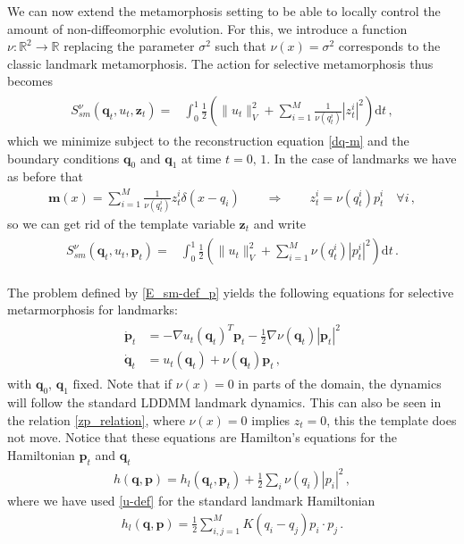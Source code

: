 \documentclass[runningheads]{llncs}
\newcommand{\half}{\frac 12}
\newcommand{\norm}[2]{\| #1 \|_{ #2 }}
\newcommand{\vnorm}[1]{\norm{ #1 }{V}}
\newcommand{\diff}[1]{\text{d} #1}
\begin{document}
We can now extend the metamorphosis setting to be able to locally control the
amount of non-diffeomorphic evolution.  For this, we introduce a function $\nu:
\mathbb R^2\to \mathbb R$ replacing the parameter $\sigma^2$ such that
$\nu(x)=\sigma^2$ corresponds to the classic landmark metamorphosis. The action 
for selective metamorphosis thus becomes 
\begin{align}
  \begin{split}
    S_{sm}^\nu(\mathbf q_t, u_t, \mathbf z_t) = & \int_0^1
    \half  \left (\vnorm{u_t}^2 +\sum_{i=1}^M \frac{1}{\nu(q_t^i)}|z_t^i|^2\right )\diff{t}\, , 
  \end{split}
  \label{E_sm-def}
\end{align}
which we minimize subject to the reconstruction equation \eqref{dq-m} and the
boundary conditions $\mathbf q_0$ and $\mathbf q_1$ at time $t=0,\,1$. In the
case of landmarks we have as before that
\begin{align}\label{zp_relation}
  \mathbf m(x) = \sum_{i=1}^M \frac{1}{\nu(q_t^i)} z_t^i\delta(x-q_i)\qquad \Rightarrow \qquad
  z_t^i = \nu(q_t^i) p_t^i\quad \forall i\, , 
\end{align}
so we can get rid of the template variable $\mathbf z_t$ and write  
\begin{align}
  \begin{split}
    S_{sm}^\nu(\mathbf q_t, u_t, \mathbf p_t) = & \int_0^1
    \half  \left (\|u_t\|_V^2  +\sum_{i=1}^M \nu(q_t^i)|p_t^i|^2\right )\diff{t}\, . 
  \end{split}
  \label{E_sm-def_p}
\end{align}

The problem defined by \eqref{E_sm-def_p} yields the following equations for
selective metarmorphosis for landmarks:
\begin{align}
  \begin{split}
  \dot{\mathbf p}_t &= - \nabla u_t(\mathbf q_t)^T \mathbf p_t - \frac12
  \nabla \nu(\mathbf q_t ) |\mathbf p_t|^2\\ \dot{\mathbf q}_t &= u_t(\mathbf q_t) +
  \nu(\mathbf q_t)\mathbf p_t \,,
\end{split}
  \label{eq-m-selective}
\end{align}
with $\mathbf q_0,\, \mathbf q_1 \text{ fixed}$. Note that if $\nu(x)=0$ in
parts of the domain, the dynamics will follow the standard LDDMM landmark
dynamics. This can also be seen in the relation \eqref{zp_relation}, where
$\nu(x)=0$  implies $z_t=0$, this the template does not move. 
Notice that these equations are Hamilton's equations for the
Hamiltonian $\mathbf p_t$ and $\mathbf q_t$
\begin{align}
  h(\mathbf q, \mathbf p) = h_l(\mathbf q_t,\mathbf p_t)+\frac12\sum_i\nu(q_i) |p_i|^2\,,  
\end{align}
where we have used \eqref{u-def} for the standard landmark Hamiltonian
\begin{align}
  h_l(\mathbf q, \mathbf p) =  \frac12 \sum_{i,j=1}^M K(q_i-q_j)p_i\cdot p_j\, . 
\label{hamiltonian}
\end{align}
\end{document}
